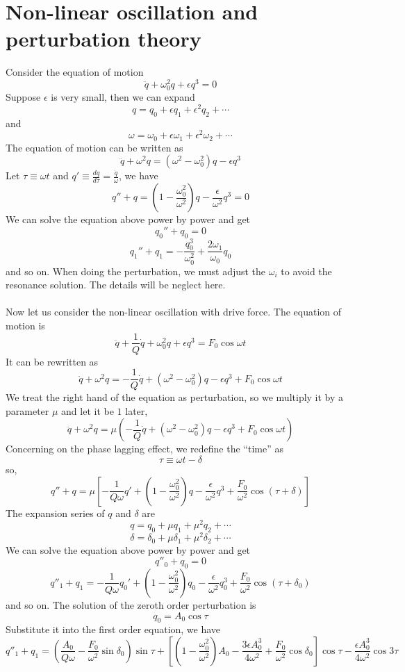 \section{Non-linear oscillation and perturbation theory}
Consider the equation of motion
\[\ddot{q} + \omega_0^2 q + \epsilon q^3 = 0\]
Suppose $\epsilon$ is very small, then we can expand
\[q = q_0 + \epsilon q_1 + \epsilon^2 q_2 + \cdots\]
and
\[\omega = \omega_0 + \epsilon \omega_1 + \epsilon^2 \omega_2 + \cdots\]
The equation of motion can be written as
\[\ddot{q} + \omega^2 q = (\omega^2 -\omega_0^2)q - \epsilon q^3\]
Let $\tau \equiv \omega t$ and $q' \equiv \frac{dq}{d\tau} = \frac{\dot{q}}{\omega}$, we have
\[q'' + q = (1- \frac{\omega_0^2}{\omega^2})q - \frac{\epsilon}{\omega^2} q^3 = 0\]
We can solve the equation above power by power and get
\[q_0'' + q_0 = 0\]
\[q_1'' + q_1 = -\frac{q_0^3}{\omega_0^2} + \frac{2\omega_1}{\omega_0}q_0\]
and so on. When doing the perturbation, we must adjust the $\omega_i$ to avoid the resonance solution. The details will be neglect here.\\ \\
Now let us consider the non-linear oscillation with drive force. The equation of motion is
\[\ddot{q} + \frac{1}{Q}\dot{q} + \omega_0^2 q + \epsilon q^3 = F_0 \cos \omega t\]
It can be rewritten as
\[\ddot{q} + \omega^2 q = - \frac{1}{Q} \dot{q} + (\omega^2 - \omega_0^2)q - \epsilon q^3 + F_0\cos\omega t\]
We treat the right hand of the equation as perturbation, so we multiply it by a parameter $\mu$ and let it be $1$ later,
\[\ddot{q} + \omega^2 q = \mu \left (- \frac{1}{Q} \dot{q} + (\omega^2 - \omega_0^2)q - \epsilon q^3 + F_0\cos\omega t \right )\]
Concerning on the phase lagging effect, we redefine the ``time'' as 
\[\tau \equiv \omega t - \delta\]
so,
\[q'' + q = \mu \left [ -\frac{1}{Q\omega} q' + \left ( 1- \frac{\omega_0^2}{\omega^2} \right ) q - \frac{\epsilon}{\omega^2} q^3 + \frac{F_0}{\omega^2} \cos (\tau + \delta) \right ]\]
The expansion series of $q$ and $\delta$ are
\[q = q_0 + \mu q_1 + \mu^2 q_2 + \cdots\]
\[\delta = \delta_0 + \mu \delta_1 + \mu^2 \delta_2 + \cdots\]
We can solve the equation above power by power and get
\[q''_0 + q_0 = 0\]
\[q''_1 + q_1 =  -\frac{1}{Q\omega} q_0' + \left ( 1- \frac{\omega_0^2}{\omega^2} \right ) q_0 - \frac{\epsilon}{\omega^2} q_0^3 + \frac{F_0}{\omega^2} \cos (\tau + \delta_0)\]
and so on. The solution of the zeroth order perturbation is
\[q_0 = A_0 \cos\tau\]
Substitute it into the first order equation, we have
\[q''_1 + q_1 = \left ( \frac{A_0}{Q\omega} - \frac{F_0}{\omega^2} \sin\delta_0 \right ) \sin\tau + \left [ \left ( 1 - \frac{\omega_0^2}{\omega^2}\right ) A_0 - \frac{3\epsilon A_0^3}{4\omega^2} + \frac{F_0}{\omega^2}\cos\delta_0 \right ] \cos\tau - \frac{\epsilon A_0^3}{4\omega^2} \cos 3\tau\]
